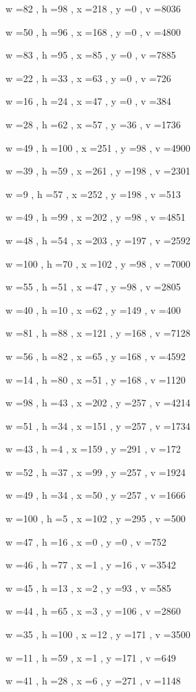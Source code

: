 \documentclass[11pt]{article}
\begin{document}
w =82 , h =98 , x =218 , y =0 , v =8036
\par
w =50 , h =96 , x =168 , y =0 , v =4800
\par
w =83 , h =95 , x =85 , y =0 , v =7885
\par
w =22 , h =33 , x =63 , y =0 , v =726
\par
w =16 , h =24 , x =47 , y =0 , v =384
\par
w =28 , h =62 , x =57 , y =36 , v =1736
\par
w =49 , h =100 , x =251 , y =98 , v =4900
\par
w =39 , h =59 , x =261 , y =198 , v =2301
\par
w =9 , h =57 , x =252 , y =198 , v =513
\par
w =49 , h =99 , x =202 , y =98 , v =4851
\par
w =48 , h =54 , x =203 , y =197 , v =2592
\par
w =100 , h =70 , x =102 , y =98 , v =7000
\par
w =55 , h =51 , x =47 , y =98 , v =2805
\par
w =40 , h =10 , x =62 , y =149 , v =400
\par
w =81 , h =88 , x =121 , y =168 , v =7128
\par
w =56 , h =82 , x =65 , y =168 , v =4592
\par
w =14 , h =80 , x =51 , y =168 , v =1120
\par
w =98 , h =43 , x =202 , y =257 , v =4214
\par
w =51 , h =34 , x =151 , y =257 , v =1734
\par
w =43 , h =4 , x =159 , y =291 , v =172
\par
w =52 , h =37 , x =99 , y =257 , v =1924
\par
w =49 , h =34 , x =50 , y =257 , v =1666
\par
w =100 , h =5 , x =102 , y =295 , v =500
\par
w =47 , h =16 , x =0 , y =0 , v =752
\par
w =46 , h =77 , x =1 , y =16 , v =3542
\par
w =45 , h =13 , x =2 , y =93 , v =585
\par
w =44 , h =65 , x =3 , y =106 , v =2860
\par
w =35 , h =100 , x =12 , y =171 , v =3500
\par
w =11 , h =59 , x =1 , y =171 , v =649
\par
w =41 , h =28 , x =6 , y =271 , v =1148
\par
\newpage
\end{document}
